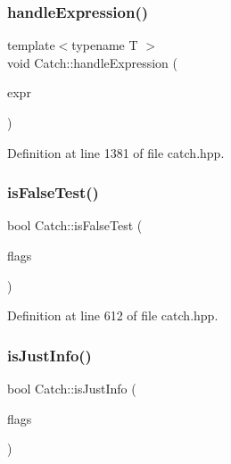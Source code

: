 \mbox{\label{namespace_catch_af2c93db76668a981e75ae835699efce7}} 
\subsubsection{\texorpdfstring{handle\+Expression()}{handleExpression()}\hspace{0.1cm}{\footnotesize\ttfamily [2/2]}}
{\footnotesize\ttfamily template$<$typename T $>$ \\
void Catch\+::handle\+Expression (\begin{DoxyParamCaption}\item[{\mbox{\hyperlink{class_catch_1_1_expr_lhs}{Expr\+Lhs}}$<$ T $>$ const \&}]{expr }\end{DoxyParamCaption})}



Definition at line 1381 of file catch.\+hpp.

\mbox{\label{namespace_catch_a93ef4e3e307a2021ca0d41b32c0e54b0}} 
\subsubsection{\texorpdfstring{is\+False\+Test()}{isFalseTest()}}
{\footnotesize\ttfamily bool Catch\+::is\+False\+Test (\begin{DoxyParamCaption}\item[{int}]{flags }\end{DoxyParamCaption})\hspace{0.3cm}{\ttfamily [inline]}}



Definition at line 612 of file catch.\+hpp.

\mbox{\label{namespace_catch_a54b01af61673a3e1f21f31713639b180}} 
\subsubsection{\texorpdfstring{is\+Just\+Info()}{isJustInfo()}}
{\footnotesize\ttfamily bool Catch\+::is\+Just\+Info (\begin{DoxyParamCaption}\item[{int}]{flags }\end{DoxyParamCaption})}

